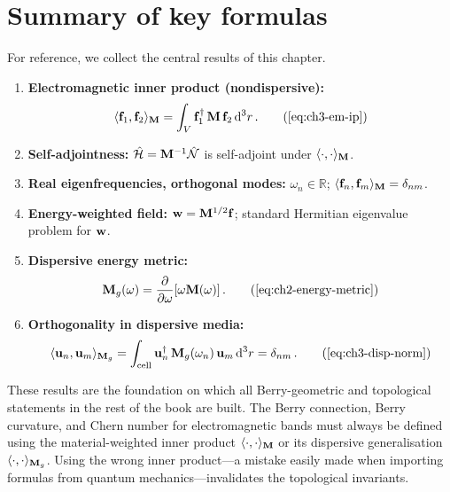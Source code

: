 \section{Summary of key formulas}
\label{sec:ch3-summary}

For reference, we collect the central results of this chapter.

\begin{enumerate}
  \item \textbf{Electromagnetic inner product (nondispersive):}
  \begin{equation}
    \emip{\emfield_1}{\emfield_2}
    = \int_V\emfield_1^\dagger\,\Mmat\,\emfield_2\,\dd^3r\,.
    \tag{\ref{eq:ch3-em-ip}}
  \end{equation}

  \item \textbf{Self-adjointness:}
  $\hat{\mathcal{H}}=\mathbf{M}^{-1}\hat{\mathcal{N}}$ is self-adjoint under $\langle\cdot,\cdot\rangle_{\mathbf{M}}$.

  \item \textbf{Real eigenfrequencies, orthogonal modes:}
  $\omega_n\in\mathbb{R}$;\quad
  $\langle \mathbf{f}_n , \mathbf{f}_m \rangle_{\mathbf{M}}=\delta_{nm}$.

  \item \textbf{Energy-weighted field:}
  $\mathbf{w}=\mathbf{M}^{1/2}\mathbf{f}$;\quad
  standard Hermitian eigenvalue problem for $\mathbf{w}$.

  \item \textbf{Dispersive energy metric:} \cite{gangaraj2016berry,silveirinha2016bulk}
  \begin{equation}
    \Mgmat(\omega)=\pderiv{}{\omega}[\omega\Mmat(\omega)]\,.
    \tag{\ref{eq:ch2-energy-metric}}
  \end{equation}

  \item \textbf{Orthogonality in dispersive media:}
  \begin{equation}
    \eip{\mathbf{u}_n}{\mathbf{u}_m}
    = \int_{\mathrm{cell}}
    \mathbf{u}_n^\dagger\,\Mgmat(\omega_n)\,\mathbf{u}_m\,\dd^3r
    = \delta_{nm}\,.
    \tag{\ref{eq:ch3-disp-norm}}
  \end{equation}
\end{enumerate}

These results are the foundation on which all Berry-geometric and
topological statements in the rest of the book are built.  The Berry
connection, Berry curvature, and Chern number for electromagnetic bands
must always be defined using the material-weighted inner product
$\langle\cdot,\cdot\rangle_{\mathbf{M}}$ or its dispersive generalisation
$\langle\cdot,\cdot\rangle_{\mathbf{M}_g}$.  Using the wrong inner product---a
mistake easily made when importing formulas from quantum
mechanics---invalidates the topological invariants.

